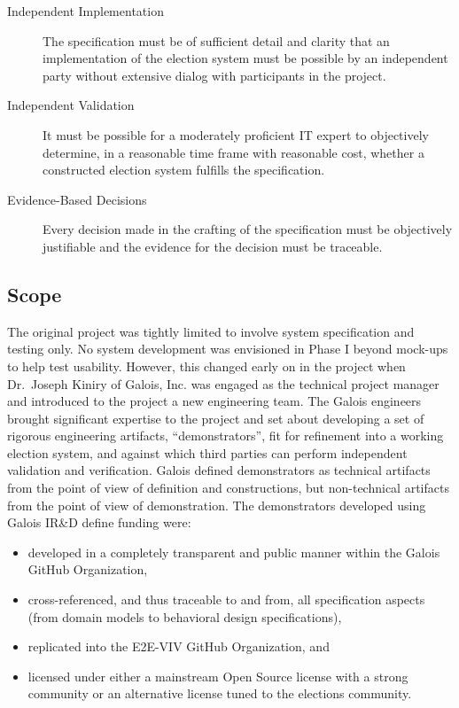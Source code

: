 \begin{description}
\item[Independent Implementation] The specification must be of
  sufficient detail and clarity that an implementation of the election
  system must be possible by an independent party without extensive
  dialog with participants in the project.
\item[Independent Validation] It must be possible for a moderately
  proficient IT expert to objectively determine, in a reasonable time
  frame with reasonable cost, whether a constructed election system
  fulfills the specification.
\item[Evidence-Based Decisions] Every decision made in the crafting of
  the specification must be objectively justifiable and the evidence
  for the decision must be traceable.
\end{description}

\subsection{Scope}
\label{sec:scope}

The original project was tightly limited to involve system
specification and testing only. No system development was envisioned
in Phase I beyond mock-ups to help test usability. However, this
changed early on in the project when Dr.~Joseph Kiniry of Galois, Inc.
was engaged as the technical project manager and introduced to the project
a new engineering team. 
The Galois engineers brought significant expertise to the project and
set about developing a set of rigorous engineering artifacts,
``demonstrators'', fit for refinement into a working election system,
and against which third parties can perform independent validation and
verification. Galois defined demonstrators as technical
artifacts from the point of view of definition and constructions, but
non-technical artifacts from the point of view of
demonstration. The demonstrators developed using
Galois IR\&D {define} funding were:
\begin{itemize}
\item developed in a completely transparent and public manner within
  the Galois GitHub Organization,
\item cross-referenced, and thus traceable to and from, all
  specification aspects (from domain models to behavioral design
  specifications),
\item replicated into the E2E-VIV GitHub Organization, and
\item licensed under either a mainstream Open Source license with a
  strong community or an alternative license tuned to the elections
  community.
\end{itemize}

